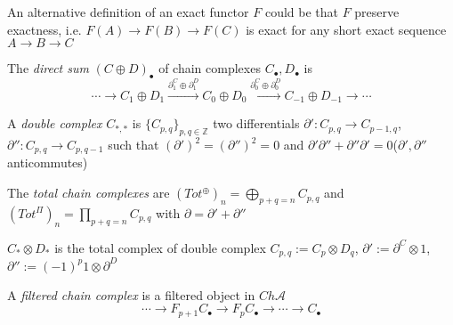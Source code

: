 \documentclass[main]{subfiles}
\begin{document}
\begin{lemma}
An alternative definition of an exact functor $F$ could be that $F$ preserve exactness, i.e. $F(A)\to F(B)\to F(C)$ is exact for any short exact sequence $A\to B\to C$
\end{lemma}

\begin{definition}
The \textit{direct sum} $(C\oplus D)_\bullet$ of chain complexes $C_\bullet,D_\bullet$ is
\[\cdots\to C_{1}\oplus D_1\xrightarrow{\partial^C_1\oplus\partial^D_1}C_0\oplus D_0\xrightarrow{\partial^C_0\oplus\partial^D_0}C_{-1}\oplus D_{-1}\to\cdots\]
\end{definition}

\begin{definition}
A \textit{double complex} $C_{*,*}$ is $\{C_{p,q}\}_{p,q\in\mathbb Z}$ two differentials $\partial':C_{p,q}\to C_{p-1,q}$, $\partial'':C_{p,q}\to C_{p,q-1}$ such that $(\partial')^2=(\partial'')^2=0$ and $\partial'\partial''+\partial''\partial'=0$($\partial',\partial''$ anticommutes) \par
The \textit{total chain complexes} are $(Tot^\oplus)_n=\displaystyle\bigoplus_{p+q=n}C_{p,q}$ and $(Tot^\Pi)_n=\displaystyle\prod_{p+q=n}C_{p,q}$ with $\partial=\partial'+\partial''$
\end{definition}

\begin{example}
$C_*\otimes D_*$ is the total complex of double complex $C_{p,q}:= C_p\otimes D_q$, $\partial':=\partial^C\otimes1$, $\partial'':=(-1)^p1\otimes\partial^D$
\end{example}

\begin{definition}
A \textit{filtered chain complex} is a filtered object in $Ch\mathscr A$
\[\cdots\to F_{p+1}C_\bullet\to F_{p}C_\bullet\to\cdots\to C_\bullet\]
\end{definition}
\end{document}
